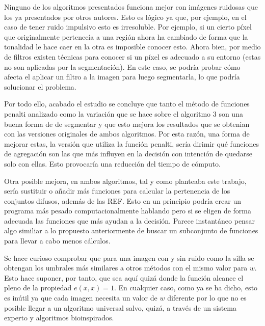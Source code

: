 \documentclass[main]{subfiles}
\begin{document}
Ninguno de los algoritmos presentados funciona mejor con imágenes ruidosas que los ya presentados por otros autores. Esto es lógico ya que, por ejemplo, en el caso de tener ruido impulsivo esto es irresoluble. Por ejemplo, si un cierto píxel que originalmente pertenecía a una región ahora ha cambiado de forma que la tonalidad le hace caer en la otra es imposible conocer esto. Ahora bien, por medio de filtros existen técnicas para conocer si un píxel es adecuado a su entorno (estas no son aplicadas por la segmentación). En este caso, se podría probar cómo afecta el aplicar un filtro a la imagen para luego segmentarla, lo que podría solucionar el problema.


Por todo ello, acabado el estudio se concluye que tanto el método de funciones penalti analizado como la variación que se hace sobre el algoritmo 3 son una buena forma de de segmentar y que esto mejora los resultados que se obtenian con las versiones originales de ambos algoritmos. Por esta razón, una forma de mejorar estas, la versión que utiliza la función penalti, sería dirimir qué funciones de agregación son las que más influyen en la decisión con intención de quedarse solo con ellas. Esto provocaría una reducción del tiempo de cómputo.

Otra posible mejora, en ambos algoritmos, tal y como planteaba este trabajo, sería sustituir o añadir más funciones para calcular la pertenencia de los conjuntos difusos, además de las REF. Esto en un principio podría crear un programa más pesado computacionalmente hablando pero si se eligen de forma adecuada las funciones que más ayudan a la decisión. Parece instantáneo pensar algo similiar a lo propuesto anteriormente de buscar un subconjunto de funciones para llevar a cabo menos cálculos.

Se hace curioso comprobar que para una imagen con y sin ruido como la silla se obtengan los umbrales más similares a otros métodos con el mismo valor para $w$. Esto hace suponer, por tanto, que sea aquí quizá donde la función alcance el pleno de la propiedad $e(x,x)=1$. En cualquier caso, como ya se ha dicho, esto es inútil ya que cada imagen necesita un valor de $w$ diferente por lo que no es posible llegar a un algoritmo universal salvo, quizá, a través de un sistema experto y algoritmos bioinspirados.
\end{document}

